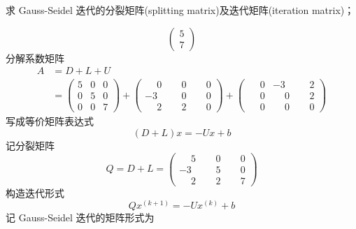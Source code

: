 \documentclass[11pt]{article}
\begin{document}
\begin{question}
\begin{subquestion}{求 Gauss-Seidel 迭代的分裂矩阵(splitting matrix)及迭代矩阵(iteration matrix)；}
{\begin{equation*}
\begin{pmatrix}
                    5 \\
                    7
                \end{pmatrix}
            \end{equation*}
            分解系数矩阵
            \begin{align*}
                A & = D + L + U \\
                  & =
                \begin{pmatrix}
                    5 & 0 & 0 \\
                    0 & 5 & 0 \\
                    0 & 0 & 7
                \end{pmatrix}
                +
                \begin{pmatrix}
                    \phantom{-}0 & \phantom{-}0 & \phantom{-}0 \\
                    -3           & \phantom{-}0 & \phantom{-}0 \\
                    \phantom{-}2 & \phantom{-}2 & \phantom{-}0
                \end{pmatrix}
                +
                \begin{pmatrix}
                    \phantom{-}0 & -3           & \phantom{-}2 \\
                    \phantom{-}0 & \phantom{-}0 & \phantom{-}2 \\
                    \phantom{-}0 & \phantom{-}0 & \phantom{-}0
                \end{pmatrix}
            \end{align*}
            写成等价矩阵表达式
            \begin{equation*}
                (D + L)x = -Ux + b
            \end{equation*}
            记分裂矩阵
            \begin{equation*}
                Q = D + L =
                \begin{pmatrix}
                    \phantom{-}5 & \phantom{-}0 & \phantom{-}0 \\
                    -3           & \phantom{-}5 & \phantom{-}0 \\
                    \phantom{-}2 & \phantom{-}2 & \phantom{-}7
                \end{pmatrix}
            \end{equation*}
            构造迭代形式
            \begin{equation*}
                Qx^{(k + 1)} = -Ux^{(k)} + b
            \end{equation*}
            记 Gauss-Seidel 迭代的矩阵形式为

}
\end{subquestion}
\end{question}
\end{document}
